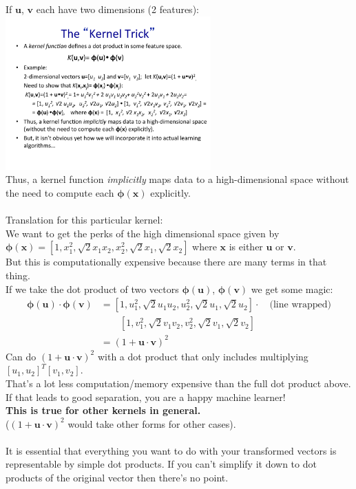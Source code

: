  If $\bm{u}$, $\bm{v}$ each have two dimensions (2 features): \hfill \\

\includegraphics[width=3.1in]{figures/example_kernel_math.pdf} \hfill \\
Thus, a kernel function \textit{implicitly} maps data to a high-dimensional space without the need to compute each $\bm{\phi}(\bm{x})$ explicitly.   \hfill \\
 \hfill \\

Translation for this particular kernel: \hfill \\
We want to get the perks of the high dimensional space given by $\bm{\phi}(\bm{x}) = [1, x_1^2, \sqrt{2}x_1 x_2, x_2^2, \sqrt{2} x_1, \sqrt{2} x_2]$ where $\bm{x}$ is either $\bm{u}$ or $\bm{v}$.  \hfill \\
But this is computationally expensive because there are many terms in that thing.  \hfill \\
If we take the dot product of two vectors $\bm{\phi}(\bm{u})$, $\bm{\phi}(\bm{v})$ we get some magic: \hfill \\
\begin{align*}
	\bm{\phi}(\bm{u}) \cdot \bm{\phi}(\bm{v}) &= [1, u_1^2, \sqrt{2}u_1 u_2, u_2^2, \sqrt{2} u_1, \sqrt{2} u_2]  \cdot \quad \mbox{(line wrapped)} \\
			& \quad \quad [1, v_1^2, \sqrt{2}v_1 v_2, v_2^2, \sqrt{2} v_1, \sqrt{2} v_2]   \\
		&=  (1 + \bm{u} \cdot \bm{v})^2
\end{align*}
Can do $(1 + \bm{u} \cdot \bm{v})^2$ with a dot product that only includes multiplying $[u_1, u_2]^T[v_1, v_2]$.     \hfill \\ 
That's a lot less computation/memory expensive than the full dot product above.  \hfill \\
If that leads to good separation, you are a happy machine learner!   \hfill \\
\textbf{This is true for other kernels in general.}   \hfill \\
($(1 + \bm{u} \cdot \bm{v})^2$ would take other forms for other cases).   \hfill \\
\hfill \\

It is essential that everything you want to do with your transformed vectors is representable by simple dot products.
If you can't simplify it down to dot products of the original vector then there's no point. 





